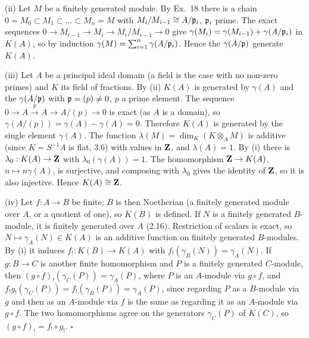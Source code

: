 \documentclass[11pt]{article}
\begin{document}
(ii) Let $M$ be a finitely generated module. By Ex.~18 there is a chain $0=M_0\subset M_1\subset\dots\subset M_n=M$ with $M_i/M_{i-1}\cong A/\mathfrak p_i$, $\mathfrak p_i$ prime. The exact sequences $0\to M_{i-1}\to M_i\to M_i/M_{i-1}\to0$ give $\gamma(M_i)=\gamma(M_{i-1})+\gamma(A/\mathfrak p_i)$ in $K(A)$, so by induction $\gamma(M)=\sum_{i=1}^n\gamma(A/\mathfrak p_i)$. Hence the $\gamma(A/\mathfrak p)$ generate $K(A)$.

(iii) Let $A$ be a principal ideal domain (a field is the case with no non-zero primes) and $K$ its field of fractions. By (ii) $K(A)$ is generated by $\gamma(A)$ and the $\gamma(A/\mathfrak p)$ with $\mathfrak p=(p)\ne0$, $p$ a prime element. The sequence $0\to A\xrightarrow{\;p\;}A\to A/(p)\to0$ is exact (as $A$ is a domain), so $\gamma(A/(p))=\gamma(A)-\gamma(A)=0$. Therefore $K(A)$ is generated by the single element $\gamma(A)$. The function $\lambda(M)=\dim_K(K\otimes_AM)$ is additive (since $K=S^{-1}A$ is flat, 3.6) with values in $\mathbf Z$, and $\lambda(A)=1$. By (i) there is $\lambda_0:K(A)\to\mathbf Z$ with $\lambda_0(\gamma(A))=1$. The homomorphism $\mathbf Z\to K(A)$, $n\mapsto n\gamma(A)$, is surjective, and composing with $\lambda_0$ gives the identity of $\mathbf Z$, so it is also injective. Hence $K(A)\cong\mathbf Z$.

(iv) Let $f:A\to B$ be finite; $B$ is then Noetherian (a finitely generated module over $A$, or a quotient of one), so $K(B)$ is defined. If $N$ is a finitely generated $B$-module, it is finitely generated over $A$ (2.16). Restriction of scalars is exact, so $N\mapsto\gamma_A(N)\in K(A)$ is an additive function on finitely generated $B$-modules. By (i) it induces $f_!:K(B)\to K(A)$ with $f_!(\gamma_B(N))=\gamma_A(N)$. If $g:B\to C$ is another finite homomorphism and $P$ is a finitely generated $C$-module, then $(g\circ f)_!(\gamma_C(P))=\gamma_A(P)$, where $P$ is an $A$-module via $g\circ f$, and $f_!g_!(\gamma_C(P))=f_!(\gamma_B(P))=\gamma_A(P)$, since regarding $P$ as a $B$-module via $g$ and then as an $A$-module via $f$ is the same as regarding it as an $A$-module via $g\circ f$. The two homomorphisms agree on the generators $\gamma_C(P)$ of $K(C)$, so $(g\circ f)_!=f_!\circ g_!$. \hfill$\square$
\end{document}
